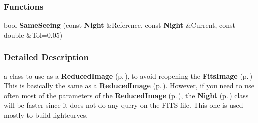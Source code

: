 \subsubsection*{Functions}
\begin{CompactItemize}
\item 
{}
bool {\bf Same\-Seeing} (const {\bf Night} \&Reference, const {\bf Night} \&Current, const double \&Tol=0.05)\label{night_h_a2}

\end{CompactItemize}


\subsubsection{Detailed Description}
a class to use as a {\bf Reduced\-Image} {\rm (p.\,\pageref{class_reducedimage})}, to avoid reopening the {\bf Fits\-Image} {\rm (p.\,\pageref{class_fitsimage})} This is basically the same as a {\bf Reduced\-Image} {\rm (p.\,\pageref{class_reducedimage})}. However, if you need to use often most of the parameters of the {\bf Reduced\-Image} {\rm (p.\,\pageref{class_reducedimage})}, the {\bf Night} {\rm (p.\,\pageref{class_night})} class will be faster since it does not do any query on the FITS file. This one is used mostly to build lightcurves.



